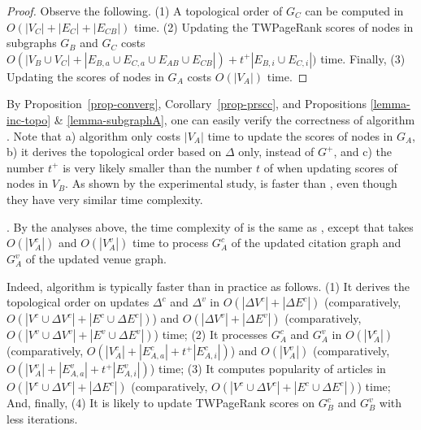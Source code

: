 \begin{proof}
Observe the following. (1) A topological order of $G_C$ can be computed in $O(|V_C|+|E_C|+|E_{CB}|)$ time.
(2) Updating the TWPageRank scores of nodes in subgraphs $G_B$ and $G_C$ costs $O(|V_B\cup V_C|+|E_{B,a}\cup E_{C,a}\cup E_{AB}\cup E_{CB}|)+t^+|E_{B,i}\cup E_{C,i}|)$ time. Finally, (3) Updating the scores of nodes in $G_A$ costs $O(|V_A|)$ time.
\end{proof}


By Proposition~\ref{prop-converg}, Corollary~\ref{prop-prscc}, and Propositions \ref{lemma-inc-topo} \& \ref{lemma-subgraphA}, one can easily verify the correctness of algorithm \inctwprscc.
%
Note that  a) algorithm \inctwprscc only costs $|V_A|$ time to update the scores of nodes in $G_A$, b) it derives the topological order based  on $\Delta$ only, instead of $G^{+}$, and c) the number $t^+$ is very likely smaller than the number $t$ of \twprscc when updating scores of nodes in $V_B$. As shown by the experimental study, \inctwprscc is faster than \twprscc, even though they have very similar time complexity.










.
By the analyses above, the time complexity of \incensemble is the same as \batensemble, except that \incensemble takes $O(|V^c_A|)$ and $O(|V^v_A|)$ time to process $G^c_A$ of the updated citation graph and $G^v_A$ of the updated  venue graph.

Indeed, algorithm \incensemble is typically faster than \batensemble in practice as follows.
(1) It derives the topological order on updates $\Delta^c$ and $\Delta^v$ in $O(|\Delta V^c|+|\Delta E^c|)$ (comparatively, $O(|V^c\cup\Delta V^c|+|E^c\cup \Delta E^c|)$) and $O(|\Delta V^v|+|\Delta E^v|)$ (comparatively, $O(|V^v\cup \Delta V^v|+|E^v\cup \Delta E^v|)$) time;
(2) It processes $G^c_A$ and $G^v_A$ in $O(|V^c_A|)$ (comparatively, $O(|V^c_A|+|E^c_{A,a}|+t^+|E^c_{A,i}|)$) and $O(|V^v_A|)$ (comparatively, $O(|V^v_A|+|E^v_{A,a}|+t^+|E^v_{A,i}|)$) time;
(3) It computes popularity of articles in $O(|V^c\cup\Delta V^c|+|\Delta E^c|)$ (comparatively, $O(|V^c\cup\Delta V^c|+|E^c\cup \Delta E^c|)$) time;
And, finally, (4) It is likely to update TWPageRank scores on $G^c_B$ and $G^v_B$ with less iterations.

